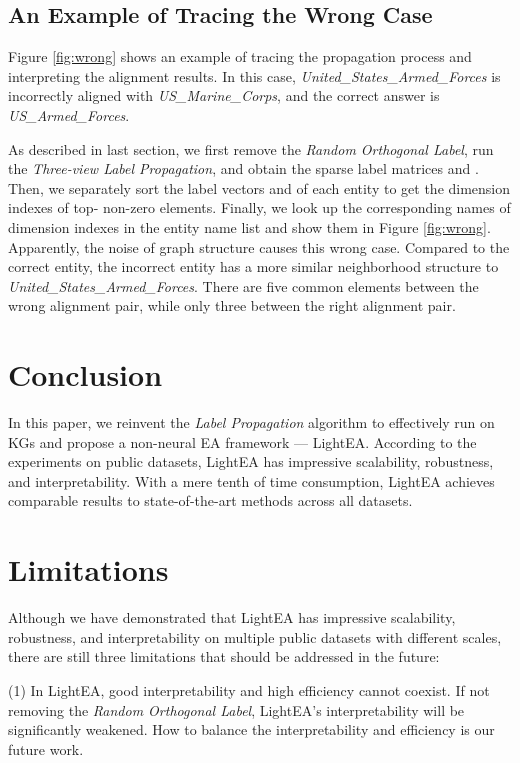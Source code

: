 \documentclass[11pt]{article}
\begin{document}
\subsection{An Example of Tracing the Wrong Case}
\label{sec:wrong_case}
Figure \ref{fig:wrong} shows an example of tracing the propagation process and interpreting the alignment results.
In this case, \emph{United\_States\_Armed\_Forces} is incorrectly aligned with \emph{US\_Marine\_Corps}, and the correct answer is \emph{US\_Armed\_Forces}.

As described in last section, we first remove the \emph{Random Orthogonal Label}, run the \emph{Three-view Label Propagation}, and obtain the sparse label matrices  and .
Then, we separately sort the label vectors  and  of each entity to get the dimension indexes of top- non-zero elements.
Finally, we look up the corresponding names of dimension indexes in the entity name list and show them in Figure \ref{fig:wrong}.
Apparently, the noise of graph structure causes this wrong case.
Compared to the correct entity, the incorrect entity has a more similar neighborhood structure to \emph{United\_States\_Armed\_Forces}.
There are five common elements between the wrong alignment pair, while only three between the right alignment pair.

\section{Conclusion}
In this paper, we reinvent the \emph{Label Propagation} algorithm to effectively run on KGs and propose a non-neural EA framework --- LightEA.
According to the experiments on public datasets, LightEA has impressive scalability, robustness, and interpretability.
With a mere tenth of time consumption, LightEA achieves comparable results to state-of-the-art methods across all datasets.

\section*{Limitations}
Although we have demonstrated that LightEA has impressive scalability, robustness, and interpretability on multiple public datasets with different scales, there are still three limitations that should be addressed in the future:

(1) In LightEA, good interpretability and high efficiency cannot coexist.
If not removing the \emph{Random Orthogonal Label}, LightEA's interpretability will be significantly weakened.
How to balance the interpretability and efficiency is our future work.
\end{document}
